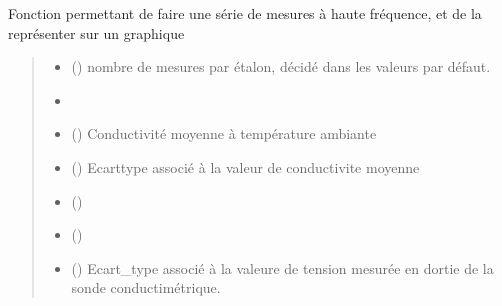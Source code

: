 \documentclass[letterpaper,10pt,french]{sphinxmanual}
\begin{document}
\begin{fulllineitems}
\label{\detokenize{Documentation:lib_conductimetre.mesure_etalonnage}}
\pysigstartsignatures
{}
\pysigstopsignatures
\sphinxAtStartPar
Fonction permettant de faire une série de mesures à haute fréquence, et de la représenter sur un graphique
\begin{quote}\begin{description}
\begin{itemize}
\item {} 
\sphinxAtStartPar
{} () \textendash{} nombre de mesures par étalon, décidé dans les valeurs par défaut.

\item {} 
\sphinxAtStartPar
{} \textendash{} 

\item {} 
\sphinxAtStartPar
{} () \textendash{} Conductivité moyenne à température ambiante

\item {} 
\sphinxAtStartPar
{} () \textendash{} Ecart\sphinxhyphen{}type associé à la valeur de conductivite moyenne

\item {} 
\sphinxAtStartPar
{} () \textendash{} 

\item {} 
\sphinxAtStartPar
{} () \textendash{} 

\item {} 
\sphinxAtStartPar
{} () \textendash{} Ecart\_type associé à la valeure de tension mesurée en dortie de la sonde conductimétrique.


\end{itemize}
\end{description}
\end{quote}
\end{fulllineitems}
\end{document}
